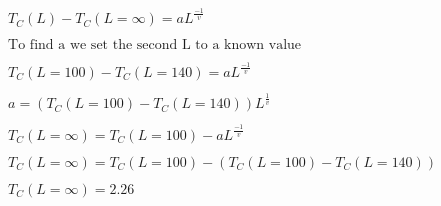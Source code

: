 \begin{align*}
    &T_C (L) - T_C (L=\infty) = a L^{\frac{-1}{v}}
    \\
    \\
    &\text{To find a we set the second L to a known value}
    \\
    \\
    &T_C (L=100) - T_C (L=140) = a L^{\frac{-1}{v}}
    \\
    \\
    &a = 
    \left(
    T_C (L=100) - T_C (L=140)
    \right)
    L^{\frac{1}{v}}
    \\
    \\
    &T_C (L=\infty) = T_C (L=100) - a L^{\frac{-1}{v}} 
    \\
    \\
    &T_C (L=\infty) = T_C (L=100) - \left(
    T_C (L=100) - T_C (L=140)
    \right)
    \\
    \\
    &T_C (L=\infty) = 2.26 
\end{align*}
